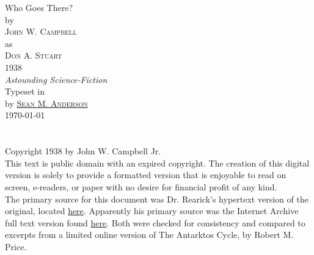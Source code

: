 \documentclass[letterpaper,openany,12pt]{memoir}		%
\begin{document}
\frontmatter
\pagestyle{empty}
\begin{titlingpage}
\begin{center}
\vspace*{\fill}
{\maintitle Who Goes There?}\\\vspace{25pt}
{\large by}\\\vspace{25pt}
{\Large\textsc{John W. Campbell}}\\\vspace{5pt}
{\large as}\\\vspace{6pt}
{\Large\textsc{Don A. Stuart}}\\\vspace{25pt}
{\Large 1938\\\vspace{6pt}\emph{Astounding Science-Fiction}}\\
\vfill
Typeset in \XeLaTeX\\by {\href{https://github.com/roguephysicist/who_goes_there}
                        {\textsc{Sean M. Anderson}}}\\
\today
\vspace*{\fill}
\end{center}
\end{titlingpage}
\chapter*{}
\vspace*{\fill}
Copyright \textcopyright{} 1938 by John W. Campbell Jr.\\

\noindent This text is public domain with an expired copyright. The creation of
this digital version is solely to provide a formatted version that is enjoyable
to read on screen, e-readers, or paper with no desire for financial profit of
any kind.\\

\noindent The primary source for this document was Dr. Rearick's hypertext
version of the original, located
\href{http://nzr.mvnu.edu/faculty/trearick/english/rearick/readings/manuscri/Who%20Goes%20There/Who%20Goes%20There%20Index.htm}{here}. 
Apparently his primary source was the Internet Archive full text version found
\href{http://www.archive.org/stream/WhoGoesThere_414/WhoGoesThere.txt}{here}.
Both were checked for consistency and compared to excerpts from a limited online
version of The Antarktos Cycle, by Robert M. Price.
\end{document}
